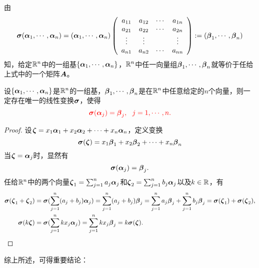 \begin{frame}
  由
  $$
  \boldsymbol{\sigma}(\boldsymbol{\alpha}_1,\cdots,\boldsymbol{\alpha}_n)=(\boldsymbol{\alpha}_1,\cdots,\boldsymbol{\alpha}_n)\left(
    \begin{array}{cccc}
      a_{11}&a_{12}&\cdots&a_{1n}\\
      a_{21}&a_{22}&\cdots&a_{2n}\\
      \vdots&\vdots&&\vdots\\
      a_{n1}&a_{n2}&\cdots&a_{nn}
    \end{array}
  \right):=(\boldsymbol{\beta}_1,\cdots,\boldsymbol{\beta}_n)
  $$
  知，给定$\mathbb R^n$中的一组基$\{\boldsymbol{\alpha}_1,\cdots,\boldsymbol{\alpha}_n\}$，$\mathbb R^n$中任一向量组$\boldsymbol{\beta}_1,\cdots,\boldsymbol{\beta}_n$就等价于任给上式中的一个矩阵$\boldsymbol{A}$。\vspace{.1in}\pause 

\end{frame}


\begin{frame}
  \begin{dingli}
    设$\{\boldsymbol{\alpha}_1,\cdots,\boldsymbol{\alpha}_n\}$是$\mathbb R^n$的一组基，$\boldsymbol{\beta}_1,\cdots,\boldsymbol{\beta}_n$是在$\mathbb R^n$中任意给定的$n$个向量，则一定存在唯一的线性变换$\boldsymbol{\sigma}$，使得
    $$
    \textcolor{red}{\boldsymbol{\sigma}(\boldsymbol{\alpha}_j)=\boldsymbol{\beta}_j, ~~ j=1,\cdots,n.}
    $$
  \end{dingli} \vspace{.1in} \pause 

  \begin{proof}
     \vspace{.1in}

    设$\boldsymbol{\zeta}=x_1\boldsymbol{\alpha}_1+x_2\boldsymbol{\alpha}_2+\cdots+x_n\boldsymbol{\alpha}_n$，定义变换
    $$
    \boldsymbol{\sigma}(\boldsymbol{\zeta})=x_1\boldsymbol{\beta}_1+x_2\boldsymbol{\beta}_2+\cdots+x_n\boldsymbol{\beta}_n
    $$\pause 
    当$\boldsymbol{\zeta}=\boldsymbol{\alpha}_j$时，显然有
    $$
    \boldsymbol{\sigma}(\boldsymbol{\alpha}_j)=\boldsymbol{\beta}_j.
    $$\vspace{.1in} \pause 
    任给$\mathbb R^n$中的两个向量$\boldsymbol{\zeta}_1=\sum_{j=1}^na_j\boldsymbol{\alpha}_j$和$\boldsymbol{\zeta}_2=\sum_{j=1}^nb_j\boldsymbol{\alpha}_j$以及$k\in \mathbb R$，有
    $$
    \begin{aligned}
      \boldsymbol{\sigma}(\boldsymbol{\zeta}_1+\boldsymbol{\zeta}_2)&=\boldsymbol{\sigma}(\sum_{j=1}^n(a_j+b_j)\boldsymbol{\alpha}_j)
      =\sum_{j=1}^n(a_j+b_j)\boldsymbol{\beta}_j=\sum_{j=1}^na_j\boldsymbol{\beta}_j+\sum_{j=1}^nb_j\boldsymbol{\beta}_j=\boldsymbol{\sigma}(\boldsymbol{\zeta}_1)+\boldsymbol{\sigma}(\boldsymbol{\zeta}_2), \\
      \boldsymbol{\sigma}(k\boldsymbol{\zeta})&=\boldsymbol{\sigma}(\sum_{j=1}^nkx_j\boldsymbol{\alpha}_j)=\sum_{j=1}^nkx_j\boldsymbol{\beta}_j=k\boldsymbol{\sigma}(\boldsymbol{\zeta}).
    \end{aligned}
    $$ 
  \end{proof}
\end{frame}


\begin{frame}
  综上所述，可得重要结论：

\end{frame}